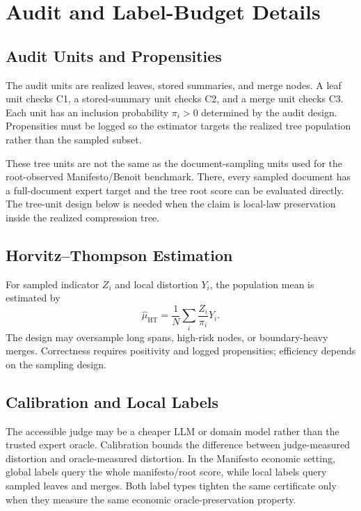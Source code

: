\section{Audit and Label-Budget Details}\label{app:min-audit}

\subsection{Audit Units and Propensities}

The audit units are realized leaves, stored summaries, and merge nodes. A leaf
unit checks C1, a stored-summary unit checks C2, and a merge unit checks C3.
Each unit has an inclusion probability $\pi_i>0$ determined by the audit
design. Propensities must be logged so the estimator targets the realized tree
population rather than the sampled subset.

These tree units are not the same as the document-sampling units used for the
root-observed Manifesto/Benoit benchmark. There, every sampled document has a
full-document expert target and the tree root score can be evaluated directly.
The tree-unit design below is needed when the claim is local-law preservation
inside the realized compression tree.

\subsection{Horvitz--Thompson Estimation}

For sampled indicator $Z_i$ and local distortion $Y_i$, the population mean is
estimated by
\[
\hat{\mu}_{\mathrm{HT}}=\frac{1}{N}\sum_i \frac{Z_i}{\pi_i}Y_i.
\]
The design may oversample long spans, high-risk nodes, or boundary-heavy
merges. Correctness requires positivity and logged propensities; efficiency
depends on the sampling design.

\subsection{Calibration and Local Labels}

The accessible judge may be a cheaper LLM or domain model rather than the
trusted expert oracle. Calibration bounds the difference between judge-measured
distortion and oracle-measured distortion. In the Manifesto economic setting,
global labels query the whole manifesto/root score, while local labels query
sampled leaves and merges. Both label types tighten the same certificate only
when they measure the same economic oracle-preservation property.

